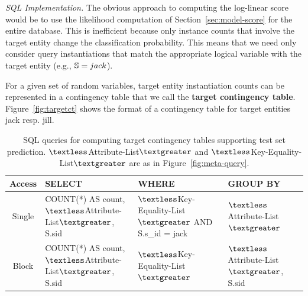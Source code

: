 {\em SQL Implementation.} 
The obvious approach to computing the log-linear score would be to use the likelihood computation of Section~\ref{sec:model-score} for the entire database.
This is inefficient because only instance counts that involve the target entity change the classification probability. 
This means that we need only consider query instantiations that match the appropriate logical variable with the target entity (e.g., $\S = jack$). 

For a given set of random variables, target entity instantiation counts can be represented in a contingency table that we call the \textbf{target contingency table}. Figure~\ref{fig:targetct} shows the format of a contingency table for target entities jack resp. jill.

\begin{table}[t]
\caption{SQL queries for computing target contingency tables supporting test set prediction.  $\textless$Attribute-List$\textgreater$ and  $\textless$Key-Equality-List$\textgreater$ are as in Figure~\ref{fig:meta-query}.}
\begin{center}
\begin{tabular}{|c|p{6cm}|p{5cm}|p{4cm}}
Access &SELECT&WHERE&GROUP BY\\\hline
Single &COUNT(*) AS count, $\textless$Attribute-List$\textgreater$, S.sid& $\textless$Key-Equality-List$\textgreater$ AND S.s\_id = jack&  $\textless$Attribute-List$\textgreater$\\
\hline
Block & COUNT(*) AS count,  $\textless$Attribute-List$\textgreater$, S.sid& $\textless$Key-Equality-List$\textgreater$ &  $\textless$Attribute-List$\textgreater$, S.sid\\
\end{tabular}
\end{center}
\label{table:target-query}
\end{table}%

